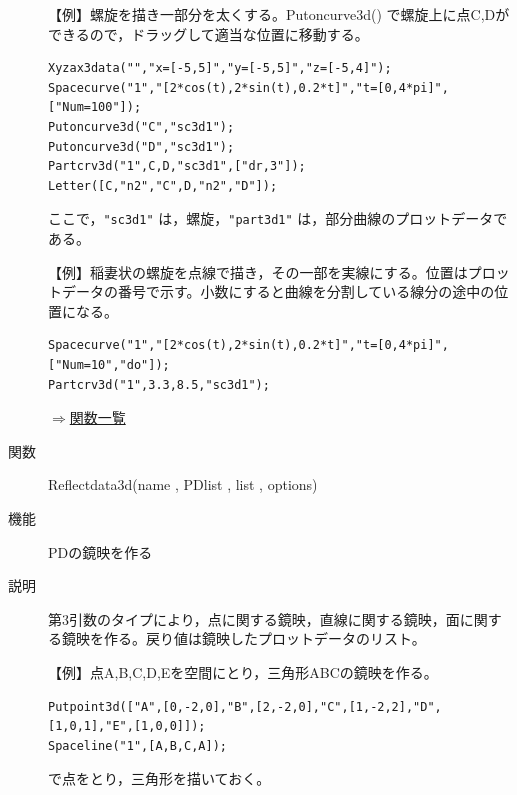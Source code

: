 \documentclass[papersize,a4paper,12pt,uplatex]{jsarticle}
\begin{document}
\begin{description}
\vspace{\baselineskip}
【例】螺旋を描き一部分を太くする。Putoncurve3d() で螺旋上に点C,Dができるので，ドラッグして適当な位置に移動する。
\begin{verbatim}
Xyzax3data("","x=[-5,5]","y=[-5,5]","z=[-5,4]");
Spacecurve("1","[2*cos(t),2*sin(t),0.2*t]","t=[0,4*pi]",["Num=100"]);
Putoncurve3d("C","sc3d1");
Putoncurve3d("D","sc3d1");
Partcrv3d("1",C,D,"sc3d1",["dr,3"]);
Letter([C,"n2","C",D,"n2","D"]);
\end{verbatim}
ここで，\verb|"sc3d1"| は，螺旋，\verb|"part3d1"| は，部分曲線のプロットデータである。

\begin{center}  \end{center}

\vspace{\baselineskip}
【例】稲妻状の螺旋を点線で描き，その一部を実線にする。位置はプロットデータの番号で示す。小数にすると曲線を分割している線分の途中の位置になる。
\begin{verbatim}
Spacecurve("1","[2*cos(t),2*sin(t),0.2*t]","t=[0,4*pi]",["Num=10","do"]);
Partcrv3d("1",3.3,8.5,"sc3d1");
\end{verbatim}
\begin{center}  \end{center}

\begin{flushright} \hyperlink{functionlist}{$\Rightarrow$関数一覧}\end{flushright}

\hypertarget{reflectdata3d}{}
\item[関数]Reflectdata3d(name , PDlist , list , options)
\item[機能]PDの鏡映を作る
\item[説明]第3引数のタイプにより，点に関する鏡映，直線に関する鏡映，面に関する鏡映を作る。戻り値は鏡映したプロットデータのリスト。

\vspace{\baselineskip}
【例】点A,B,C,D,Eを空間にとり，三角形ABCの鏡映を作る。

\begin{verbatim}
Putpoint3d(["A",[0,-2,0],"B",[2,-2,0],"C",[1,-2,2],"D",[1,0,1],"E",[1,0,0]]);
Spaceline("1",[A,B,C,A]);
\end{verbatim}

で点をとり，三角形を描いておく。


\end{description}
\end{document}
